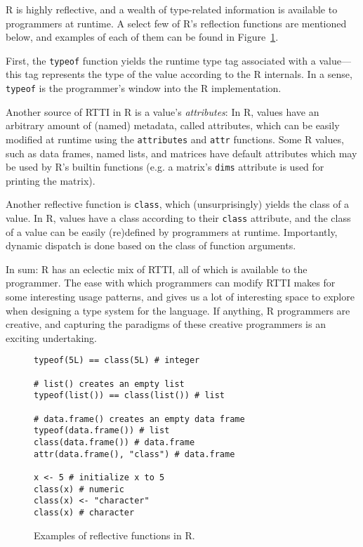 \documentclass[sigplan,10pt,review,anonymous]{acmart}\settopmatter{printfolios=true,printccs=false,printacmref=false}
\begin{document}
R is highly reflective, and a wealth of type-related information is available to programmers at runtime.
A select few of R's reflection functions are mentioned below, and examples of each of them can be found in Figure~\ref{fig:reflectionEx}.

First, the {\tt typeof} function yields the runtime type tag associated with a value---this tag represents the type of the value according to the R internals.
In a sense, {\tt typeof} is the programmer's window into the R implementation.

Another source of RTTI in R is a value's {\it attributes}:
In R, values have an arbitrary amount of (named) metadata, called attributes, which can be easily modified at runtime using the {\tt attributes} and {\tt attr} functions.
Some R values, such as data frames, named lists, and matrices have default attributes which may be used by R's builtin functions (e.g. a matrix's {\tt dims} attribute is used for printing the matrix).

Another reflective function is {\tt class}, which (unsurprisingly) yields the class of a value.
In R, values have a class according to their {\tt class} attribute, and the class of a value can be easily (re)defined by programmers at runtime.
Importantly, dynamic dispatch is done based on the class of function arguments.

In sum: R has an eclectic mix of RTTI, all of which is available to the programmer.
The ease with which programmers can modify RTTI makes for some interesting usage patterns, and gives us a lot of interesting space to explore when designing a type system for the language.
If anything, R programmers are creative, and capturing the paradigms of these creative programmers is an exciting undertaking. 

\begin{figure}

\begin{lstlisting}
typeof(5L) == class(5L) # integer

# list() creates an empty list
typeof(list()) == class(list()) # list

# data.frame() creates an empty data frame
typeof(data.frame()) # list
class(data.frame()) # data.frame
attr(data.frame(), "class") # data.frame

x <- 5 # initialize x to 5
class(x) # numeric
class(x) <- "character"
class(x) # character

\end{lstlisting}

  \caption{Examples of reflective functions in R.}
  \label{fig:reflectionEx}
\end{figure}
\end{document}
